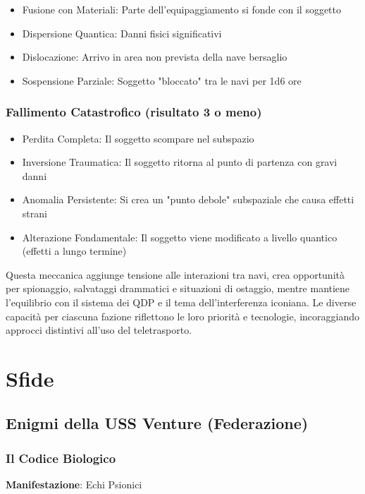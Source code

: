 \documentclass[letterpaper,twocolumn,openany,nodeprecatedcode]{dndbook}
\begin{document}
\begin{itemize}
    \item Fusione con Materiali: Parte dell'equipaggiamento si fonde con il soggetto
    \item Dispersione Quantica: Danni fisici significativi
    \item Dislocazione: Arrivo in area non prevista della nave bersaglio
    \item Sospensione Parziale: Soggetto "bloccato" tra le navi per 1d6 ore
\end{itemize}

\subsection{Fallimento Catastrofico (risultato 3 o meno)}

\begin{itemize}
    \item Perdita Completa: Il soggetto scompare nel subspazio
    \item Inversione Traumatica: Il soggetto ritorna al punto di partenza con gravi danni
    \item Anomalia Persistente: Si crea un "punto debole" subspaziale che causa effetti strani
    \item Alterazione Fondamentale: Il soggetto viene modificato a livello quantico (effetti a lungo termine)
\end{itemize}

Questa meccanica aggiunge tensione alle interazioni tra navi, crea opportunità per spionaggio, salvataggi drammatici e situazioni di ostaggio, mentre mantiene l'equilibrio con il sistema dei QDP e il tema dell'interferenza iconiana. Le diverse capacità per ciascuna fazione riflettono le loro priorità e tecnologie, incoraggiando approcci distintivi all'uso del teletrasporto.
\chapter{Sfide}

\section{Enigmi della USS Venture (Federazione)}
\subsection{Il Codice Biologico}
\textbf{Manifestazione}: Echi Psionici
\end{document}
